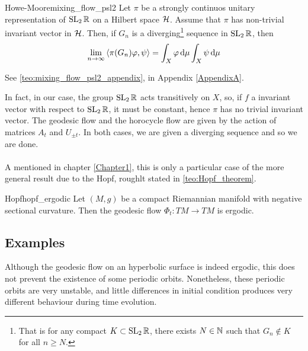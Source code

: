 \begin{impTeo}{Howe-Moore}{mixing_flow_psl2}
Let $\pi$ be a strongly continuos unitary representation of $\operatorname{SL}_{2}\mathbb{R}$ on a Hilbert space $\mathcal{H}$. Assume that $\pi$ has non-trivial invariant vector in $\mathcal{H}$. Then, if $G_{n}$ is a diverging\footnote{That is for any compact $K\subset \operatorname{SL}_{2}\mathbb{R}$, there exists $N\in\mathbb{N}$ such that $G_{n}\not\in K$ for all $n\geq N$.} sequence in $\operatorname{SL}_{2}\mathbb{R}$, then 
\[
\lim_{n\to\infty}\left< \pi(G_{n})\varphi,\psi\right>=\int_{X}\varphi\mathop{}\!\mathrm{d}\mu\int_{X}\psi\mathop{}\!\mathrm{d}\mu
\]
\end{impTeo}
\begin{prf}
See \ref{teo:mixing_flow_psl2_appendix}, in Appendix \ref{AppendixA}.
\end{prf}

In fact, in our case, the group $\operatorname{SL}_{2}\mathbb{R}$ acts transitively on $X$, so, if $f$ a invariant vector with respect to $\operatorname{SL}_{2}\mathbb{R}$, it must be constant, hence $\pi$ has no trivial invariant vector. The geodesic flow and the horocycle flow are given by the action of matrices $A_{t}$ and $U_{\pm t}$. In both cases, we are given a diverging sequence and so we are done.\\
\noindent\\
A mentioned in chapter \ref{Chapter1}, this is only a particular case of the more general result due to the Hopf, roughlt stated in \ref{teo:Hopf_theorem}.

\begin{impTeo}{Hopf}{hopf_ergodic}
Let $(M,g)$ be a compact Riemannian manifold with negative sectional curvature. Then the geodesic flow $\Phi_{t}\colon TM\to TM$ is ergodic.
\end{impTeo}


\subsection{Examples}


Although the geodesic flow on an hyperbolic surface is indeed ergodic, this does not prevent the existence of some periodic orbits. Nonetheless, these periodic orbits are very unstable, and little differences in initial condition produces very different behaviour during time evolution.



